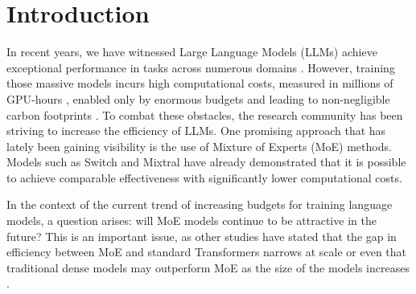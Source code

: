 \section{Introduction}
In recent years, we have witnessed Large Language Models (LLMs) achieve exceptional performance in tasks across numerous domains \citep{chowdhery2022palm, yin2023survey, agostinelli2023musiclm}. However, training those massive models incurs high computational costs, measured in millions of GPU-hours \citep{touvron2023llama2}, enabled only by enormous budgets \citep{workshop2023bloom} and leading to non-negligible carbon footprints \citep{faiz2024llmcarbon}. To combat these obstacles, the research community has been striving to increase the efficiency of LLMs. One promising approach that has lately been gaining visibility is the use of Mixture of Experts (MoE) methods.
Models such as Switch \citep{fedus2022switch} and Mixtral \citep{jiang2024mixtral} have already demonstrated that it is possible to achieve comparable effectiveness with significantly lower computational costs.



In the context of the current trend of increasing budgets for training language models, a question arises: will MoE models continue to be attractive in the future? This is an important issue, as other studies have stated that the gap in efficiency between MoE and standard Transformers narrows at scale \citep{artetxe2022efficient} or even that traditional dense models may outperform MoE as the size of the models increases \citep{clark2022unified}.

